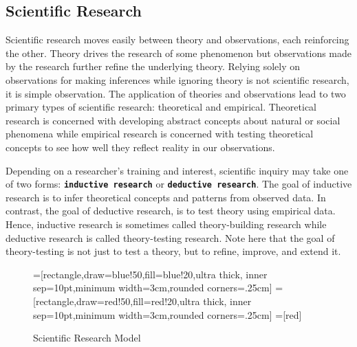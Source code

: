 \subsection{Scientific Research}

Scientific research moves easily between theory and observations, each reinforcing the other. Theory drives the research of some phenomenon but observations made by the research further refine the underlying theory. Relying solely on observations for making inferences while ignoring theory is not scientific research, it is simple observation. The application of theories and observations lead to two primary types of scientific research: theoretical and empirical. Theoretical research is concerned with developing abstract concepts about natural or social phenomena while empirical research is concerned with testing theoretical concepts to see how well they reflect reality in our observations. 

Depending on a researcher's training and interest, scientific inquiry may take one of two forms: \textbf{\texttt{inductive research}} or \textbf{\texttt{deductive research}}. The goal of inductive research is to infer theoretical concepts and patterns from observed data. In contrast, the goal of deductive research, is to test theory using empirical data. Hence, inductive research is sometimes called theory-building research while deductive research is called theory-testing research. Note here that the goal of theory-testing is not just to test a theory, but to refine, improve, and extend it. 

\begin{center}
	\begin{figure}[H]
		=[rectangle,draw=blue!50,fill=blue!20,ultra thick,
			inner sep=10pt,minimum width=3cm,rounded corners=.25cm]
		=[rectangle,draw=red!50,fill=red!20,ultra thick,
			inner sep=10pt,minimum width=3cm,rounded corners=.25cm]
		=[red]
		\caption{Scientific Research Model}
		\label{fig01.01}
	\end{figure}
\end{center}

